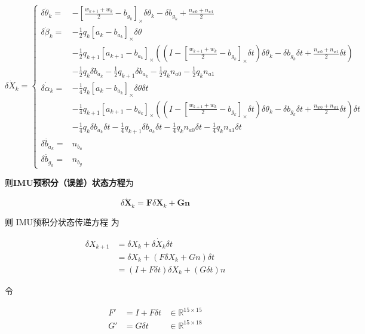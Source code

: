 \documentclass[12pt,a4paper]{article}
\begin{document}
\begin{equation}
\dot{\delta X_k} =
\begin{cases}
\dot{\delta \theta_{k}} =&
-[\frac{w_{k+1}+w_{k}}{2}-b_{g_{k}}]_{\times} \delta \theta_{k}-\delta b_{g_{k}}+\frac{n_{w0}+n_{w1}}{2} \\
\dot{\delta\beta_{k}} =&
-\frac{1}{2}q_{k}[a_{k}-b_{a_{k}}]_{\times}\delta \theta \\
&-\frac{1}{2}q_{k+1}[a_{k+1}-b_{a_{k}}]_{\times}((I-[\frac{w_{k+1}+w_{k}}{2}-b_{g_{k}}]_{\times }\delta t) \delta \theta_{k} -\delta b_{g_{k}}\delta t+\frac{n_{w0}+n_{w1}}{2}\delta t) \\
&-\frac{1}{2}q_{k}\delta b_{a_{k}}-\frac{1}{2}q_{k+1}\delta b_{a_{k}}-\frac{1}{2}q_{k}n_{a0}-\frac{1}{2}q_{k}n_{a1} \\
\dot{\delta\alpha_{k}} =&
-\frac{1}{4}q_{k}[a_{k}-b_{a_{k}}]_{\times}\delta \theta\delta t \\
&-\frac{1}{4}q_{k+1}[a_{k+1}-b_{a_{k}}]_{\times}((I-[\frac{w_{k+1}+w_{k}}{2}-b_{g_{k}}]_{\times }\delta t) \delta \theta _{k} -\delta b_{g_{k}}\delta t+\frac{n_{w0}+n_{w1}}{2}\delta t)\delta t \\
&-\frac{1}{4}q_{k}\delta b_{a_{k}}\delta t-\frac{1}{4}q_{k+1}\delta b_{a_{k}}\delta t-\frac{1}{4}q_{k}n_{a0}\delta t-\frac{1}{4}q_{k}n_{a1}\delta t \\
\dot{\delta b_{a_k}} =&  n_{b_a} \\
\dot{\delta b_{g_k}} =&  n_{b_g}
\end{cases}
\end{equation}

则\textbf{IMU预积分（误差）状态方程}为

\begin{equation}
\dot{\delta \mathbf{X}_k} = \mathbf{F} \delta \mathbf{X}_k + \mathbf{G} \mathbf{n}
\end{equation}

则 IMU预积分状态传递方程 为

\begin{equation}
\label{equ:preinte_iter_time}
\begin{aligned}
\delta X_{k+1}
&= \delta X_k + \dot{\delta X_k} \delta t \\
&= \delta X_k + (F \delta X_k + Gn) \delta t \\
&= (I + F \delta t) \delta X_k + (G \delta t) n
\end{aligned}
\end{equation}

令

\begin{equation}
\label{equ:F1_G1}
\begin{aligned}
F' &= I + F \delta t &\in \mathbb{R}^{15 \times 15} \\
G' &= G \delta t     &\in \mathbb{R}^{15 \times 18}
\end{aligned}
\end{equation}
\end{document}
